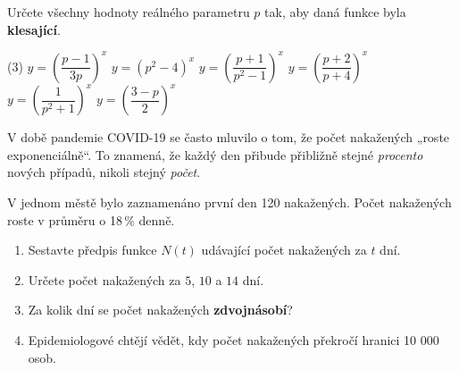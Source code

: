 \documentclass[12pt,a4paper]{article}
\begin{document}
\begin{exercise}
Určete všechny hodnoty reálného parametru $p$ tak, aby daná funkce byla \textbf{klesající}.

\begin{tasks}(3)
    \task $y = \left(\dfrac{p-1}{3p}\right)^{x}$
    \task $y = (p^{2}-4)^{x}$
    \task $y = \left(\dfrac{p+1}{p^{2}-1}\right)^{x}$
    \task $y = \left(\dfrac{p+2}{p+4}\right)^{x}$
    \task $y = \left(\dfrac{1}{p^{2}+1}\right)^{x}$
    \task $y = \left(\dfrac{3-p}{2}\right)^{x}$
\end{tasks}
\end{exercise}


\begin{exercise}

V době pandemie COVID-19 se často mluvilo o tom, že počet nakažených
„roste exponenciálně“. To znamená, že každý den přibude přibližně
stejné \emph{procento} nových případů, nikoli stejný \emph{počet}.

V jednom městě bylo zaznamenáno první den 120 nakažených.
Počet nakažených roste v průměru o 18\,\% denně.

\begin{enumerate}[label=\arabic*.]
    \item Sestavte předpis funkce $N(t)$ udávající počet nakažených za $t$ dní.
    \item Určete počet nakažených za $5$, $10$ a $14$ dní.
    \item Za kolik dní se počet nakažených \textbf{zdvojnásobí}?
    \item Epidemiologové chtějí vědět, kdy počet nakažených překročí
          hranici 10 000 osob.
\end{enumerate}
\end{exercise}
\end{document}
